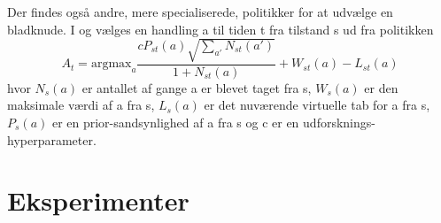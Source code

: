 \documentclass[../main.tex]{subfiles}
\begin{document}
Der findes også andre, mere specialiserede, politikker for at udvælge en bladknude. I \cite{HumansBeGone} og \cite{mcaleer2018solving} vælges en handling a til tiden t fra tilstand s ud fra politikken
$$A_t=\text{argmax}_a\frac{cP_{st}(a)\sqrt{\sum_{a'}N_{st}(a')}}{1+N_{st}(a)} + W_{st}(a) - L_{st}(a)$$
hvor $N_s(a)$ er antallet af gange a er blevet taget fra s, $W_s(a)$ er den maksimale værdi af a fra s, $L_s(a)$ er det nuværende virtuelle tab for a fra s, $P_s(a)$ er en prior-sandsynlighed af a fra s og c er en udforsknings-hyperparameter. 
  

\section{Eksperimenter}
\end{document}
